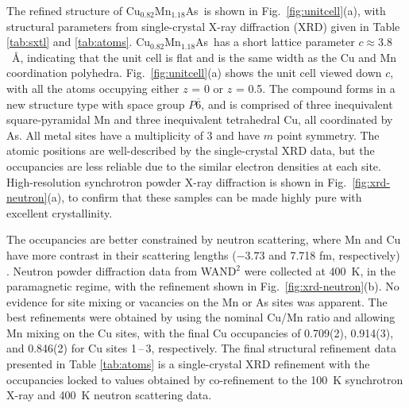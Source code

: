 \documentclass[letterpaper,10pt,doublespacing,edeposit]{uiucthesis2020}
\newcommand*{\cumnas}{Cu$_{0.82}$Mn$_{1.18}$As}
\begin{document}
\begin{mainmatter}
The refined structure of \cumnas\ is shown in Fig.\ \ref{fig:unitcell}(a), with structural parameters from single-crystal X-ray diffraction (XRD) given in Table \ref{tab:sxtl} and \ref{tab:atoms}.
{\color{black}\cumnas\ has a short lattice parameter $c \approx 3.8$~\AA, indicating that the unit cell is flat and is the same width as the Cu and Mn coordination polyhedra. Fig.\ \ref{fig:unitcell}(a) shows the unit cell viewed down $c$, with all the atoms occupying either $z$ = 0 or $z$ = 0.5.}
The compound forms in a new structure type with space group $P\overline{6}$, and is comprised of three inequivalent square-pyramidal Mn and three inequivalent tetrahedral Cu, all coordinated by As.
All metal sites have a multiplicity of 3 {\color{black} and have $m$ point symmetry}. The atomic positions are well-described by the single-crystal XRD data, but the occupancies are less reliable due to the similar electron densities at each site.  
High-resolution synchrotron powder X-ray diffraction is shown in Fig.\ \ref{fig:xrd-neutron}(a), to confirm that these samples can be made highly pure with excellent crystallinity.

The occupancies are better constrained by neutron scattering, where Mn and Cu have more contrast in their scattering lengths ($-3.73$ and 7.718 fm, respectively) \cite{sears_neutron_1992}.
Neutron powder diffraction data from WAND$^2$ were collected at 400~K, in the paramagnetic regime, with the refinement shown in Fig.\ \ref{fig:xrd-neutron}(b). 
No evidence for site mixing or vacancies on the Mn or As sites was apparent. 
The best refinements were obtained by using the nominal Cu/Mn ratio and allowing Mn mixing on the Cu sites, with the final Cu occupancies of 0.709(2), 0.914(3), and 0.846(2) for Cu sites 1\,--\,3, respectively.
The final structural refinement data presented in Table \ref{tab:atoms} is a single-crystal XRD refinement with the occupancies locked to values obtained by co-refinement to the 100~K synchrotron X-ray and 400~K neutron scattering data. 


\end{mainmatter}
\end{document}
